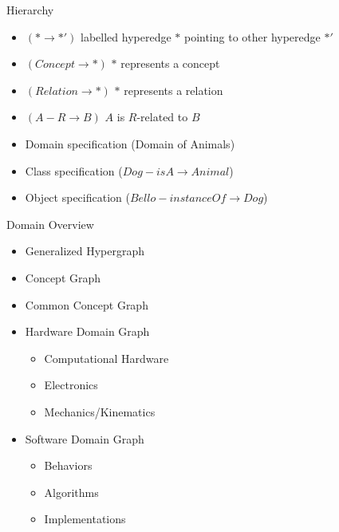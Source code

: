 \documentclass[pdf]
{beamer}
\begin{document}
\begin{frame}{Hierarchy}
	\begin{itemize}
		\item $(* \to *')$ labelled hyperedge $*$ pointing to other hyperedge $*'$
		\item $(Concept \to *)$ $*$ represents a concept
		\item $(Relation \to *)$ $*$ represents a relation
		\item $(A - R \to B)$ $A$ is $R$-related to $B$
		\item Domain specification (Domain of Animals)
		\item Class specification ($Dog - isA \to Animal$)
		\item Object specification ($Bello - instanceOf \to Dog$)
	\end{itemize}
\end{frame}

\begin{frame}{Domain Overview}
    \begin{itemize}
        \item Generalized Hypergraph
        \item Concept Graph
        \item Common Concept Graph
        \item Hardware Domain Graph
        \begin{itemize}
            \item Computational Hardware
            \item Electronics
            \item Mechanics/Kinematics
        \end{itemize}
        \item Software Domain Graph
        \begin{itemize}
            \item Behaviors
            \item Algorithms
            \item Implementations
        \end{itemize}
    \end{itemize}
\end{frame}
\end{document}
